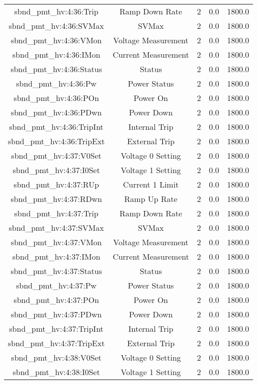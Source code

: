 \begin{center}
\begin{longtable}{c | c c c c }
sbnd\_pmt\_hv:4:36:Trip & Ramp Down Rate & 2 & 0.0 & 1800.0\\ 
sbnd\_pmt\_hv:4:36:SVMax & SVMax & 2 & 0.0 & 1800.0\\ 
sbnd\_pmt\_hv:4:36:VMon & Voltage Measurement & 2 & 0.0 & 1800.0\\ 
sbnd\_pmt\_hv:4:36:IMon & Current Measurement & 2 & 0.0 & 1800.0\\ 
sbnd\_pmt\_hv:4:36:Status & Status & 2 & 0.0 & 1800.0\\ 
sbnd\_pmt\_hv:4:36:Pw & Power Status & 2 & 0.0 & 1800.0\\ 
sbnd\_pmt\_hv:4:36:POn & Power On & 2 & 0.0 & 1800.0\\ 
sbnd\_pmt\_hv:4:36:PDwn & Power Down & 2 & 0.0 & 1800.0\\ 
sbnd\_pmt\_hv:4:36:TripInt & Internal Trip & 2 & 0.0 & 1800.0\\ 
sbnd\_pmt\_hv:4:36:TripExt & External Trip & 2 & 0.0 & 1800.0\\ 
sbnd\_pmt\_hv:4:37:V0Set & Voltage 0 Setting & 2 & 0.0 & 1800.0\\ 
sbnd\_pmt\_hv:4:37:I0Set & Voltage 1 Setting & 2 & 0.0 & 1800.0\\ 
sbnd\_pmt\_hv:4:37:RUp & Current 1 Limit & 2 & 0.0 & 1800.0\\ 
sbnd\_pmt\_hv:4:37:RDwn & Ramp Up Rate & 2 & 0.0 & 1800.0\\ 
sbnd\_pmt\_hv:4:37:Trip & Ramp Down Rate & 2 & 0.0 & 1800.0\\ 
sbnd\_pmt\_hv:4:37:SVMax & SVMax & 2 & 0.0 & 1800.0\\ 
sbnd\_pmt\_hv:4:37:VMon & Voltage Measurement & 2 & 0.0 & 1800.0\\ 
sbnd\_pmt\_hv:4:37:IMon & Current Measurement & 2 & 0.0 & 1800.0\\ 
sbnd\_pmt\_hv:4:37:Status & Status & 2 & 0.0 & 1800.0\\ 
sbnd\_pmt\_hv:4:37:Pw & Power Status & 2 & 0.0 & 1800.0\\ 
sbnd\_pmt\_hv:4:37:POn & Power On & 2 & 0.0 & 1800.0\\ 
sbnd\_pmt\_hv:4:37:PDwn & Power Down & 2 & 0.0 & 1800.0\\ 
sbnd\_pmt\_hv:4:37:TripInt & Internal Trip & 2 & 0.0 & 1800.0\\ 
sbnd\_pmt\_hv:4:37:TripExt & External Trip & 2 & 0.0 & 1800.0\\ 
sbnd\_pmt\_hv:4:38:V0Set & Voltage 0 Setting & 2 & 0.0 & 1800.0\\ 
sbnd\_pmt\_hv:4:38:I0Set & Voltage 1 Setting & 2 & 0.0 & 1800.0\\ 

\end{longtable}
\end{center}
